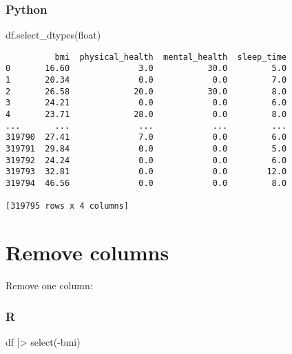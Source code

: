 \documentclass[
  letterpaper,
  DIV=11,
  numbers=noendperiod]{scrreprt}
\newenvironment{Shaded}{\begin{snugshade}}{\end{snugshade}}
\newcommand{\BuiltInTok}[1]{\textcolor[rgb]{0.00,0.46,0.62}{#1}}
\newcommand{\FunctionTok}[1]{\textcolor[rgb]{0.28,0.35,0.67}{#1}}
\newcommand{\NormalTok}[1]{\textcolor[rgb]{0.00,0.46,0.62}{#1}}
\newcommand{\SpecialCharTok}[1]{\textcolor[rgb]{0.37,0.37,0.37}{#1}}
\begin{document}
\hypertarget{python-20}{%
\subsubsection{Python}\label{python-20}}

\begin{Shaded}
\begin{Highlighting}[]
\NormalTok{df.select\_dtypes(}\BuiltInTok{float}\NormalTok{)}
\end{Highlighting}
\end{Shaded}

\begin{verbatim}
          bmi  physical_health  mental_health  sleep_time
0       16.60              3.0           30.0         5.0
1       20.34              0.0            0.0         7.0
2       26.58             20.0           30.0         8.0
3       24.21              0.0            0.0         6.0
4       23.71             28.0            0.0         8.0
...       ...              ...            ...         ...
319790  27.41              7.0            0.0         6.0
319791  29.84              0.0            0.0         5.0
319792  24.24              0.0            0.0         6.0
319793  32.81              0.0            0.0        12.0
319794  46.56              0.0            0.0         8.0

[319795 rows x 4 columns]
\end{verbatim}

\hypertarget{remove-columns}{%
\section{Remove columns}\label{remove-columns}}

Remove one column:

\hypertarget{r-21}{%
\subsubsection{R}\label{r-21}}

\begin{Shaded}
\begin{Highlighting}[]
\NormalTok{df }\SpecialCharTok{|\textgreater{}} \FunctionTok{select}\NormalTok{(}\SpecialCharTok{{-}}\NormalTok{bmi)}
\end{Highlighting}
\end{Shaded}
\end{document}
